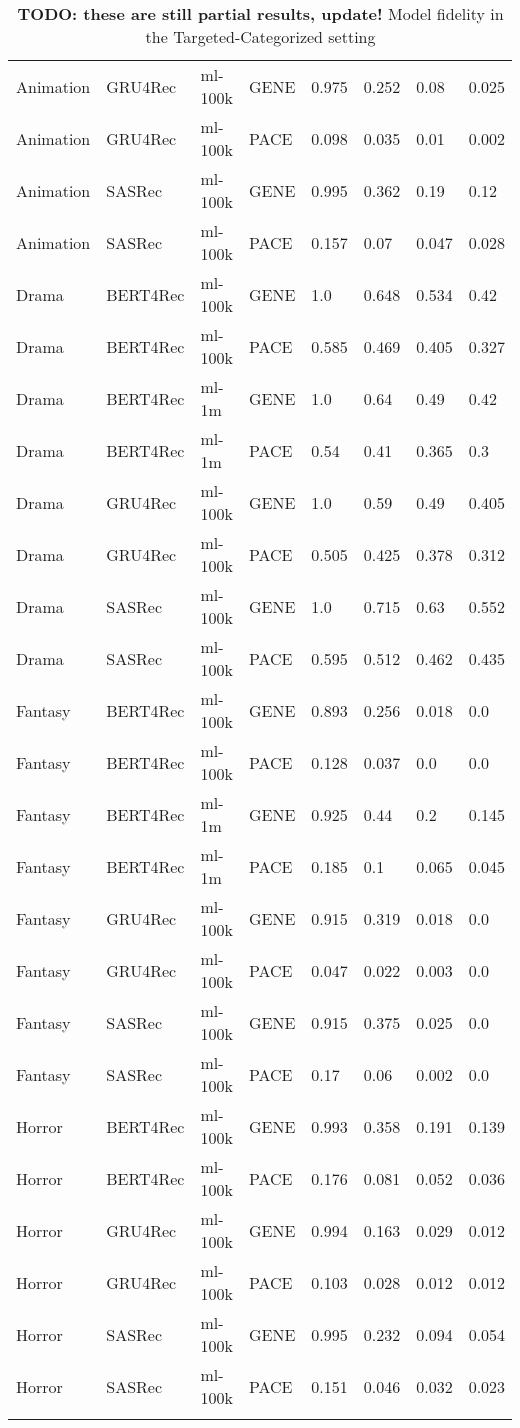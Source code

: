 \begin{longtable}{|l|l|l|l|l|l|l|l|}
Animation & GRU4Rec & ml-100k & GENE & 0.975 & 0.252 & 0.08 & 0.025 \\
Animation & GRU4Rec & ml-100k & PACE & 0.098 & 0.035 & 0.01 & 0.002 \\\hline
Animation & SASRec & ml-100k & GENE & 0.995 & 0.362 & 0.19 & 0.12 \\
Animation & SASRec & ml-100k & PACE & 0.157 & 0.07 & 0.047 & 0.028 \\\hline
Drama & BERT4Rec & ml-100k & GENE & 1.0 & 0.648 & 0.534 & 0.42 \\
Drama & BERT4Rec & ml-100k & PACE & 0.585 & 0.469 & 0.405 & 0.327 \\\hline
Drama & BERT4Rec & ml-1m & GENE & 1.0 & 0.64 & 0.49 & 0.42 \\
Drama & BERT4Rec & ml-1m & PACE & 0.54 & 0.41 & 0.365 & 0.3 \\\hline
Drama & GRU4Rec & ml-100k & GENE & 1.0 & 0.59 & 0.49 & 0.405 \\
Drama & GRU4Rec & ml-100k & PACE & 0.505 & 0.425 & 0.378 & 0.312 \\\hline
Drama & SASRec & ml-100k & GENE & 1.0 & 0.715 & 0.63 & 0.552 \\
Drama & SASRec & ml-100k & PACE & 0.595 & 0.512 & 0.462 & 0.435 \\\hline
Fantasy & BERT4Rec & ml-100k & GENE & 0.893 & 0.256 & 0.018 & 0.0 \\
Fantasy & BERT4Rec & ml-100k & PACE & 0.128 & 0.037 & 0.0 & 0.0 \\\hline
Fantasy & BERT4Rec & ml-1m & GENE & 0.925 & 0.44 & 0.2 & 0.145 \\
Fantasy & BERT4Rec & ml-1m & PACE & 0.185 & 0.1 & 0.065 & 0.045 \\\hline
Fantasy & GRU4Rec & ml-100k & GENE & 0.915 & 0.319 & 0.018 & 0.0 \\
Fantasy & GRU4Rec & ml-100k & PACE & 0.047 & 0.022 & 0.003 & 0.0 \\\hline
Fantasy & SASRec & ml-100k & GENE & 0.915 & 0.375 & 0.025 & 0.0 \\
Fantasy & SASRec & ml-100k & PACE & 0.17 & 0.06 & 0.002 & 0.0 \\\hline
Horror & BERT4Rec & ml-100k & GENE & 0.993 & 0.358 & 0.191 & 0.139 \\
Horror & BERT4Rec & ml-100k & PACE & 0.176 & 0.081 & 0.052 & 0.036 \\\hline
Horror & GRU4Rec & ml-100k & GENE & 0.994 & 0.163 & 0.029 & 0.012 \\
Horror & GRU4Rec & ml-100k & PACE & 0.103 & 0.028 & 0.012 & 0.012 \\\hline
Horror & SASRec & ml-100k & GENE & 0.995 & 0.232 & 0.094 & 0.054 \\
Horror & SASRec & ml-100k & PACE & 0.151 & 0.046 & 0.032 & 0.023 \\\hline
\caption{\textbf{TODO: these are still partial results, update!} Model fidelity in the Targeted-Categorized setting}
    \label{tab:eval_targ_cat}
    \end{longtable}
    \endgroup